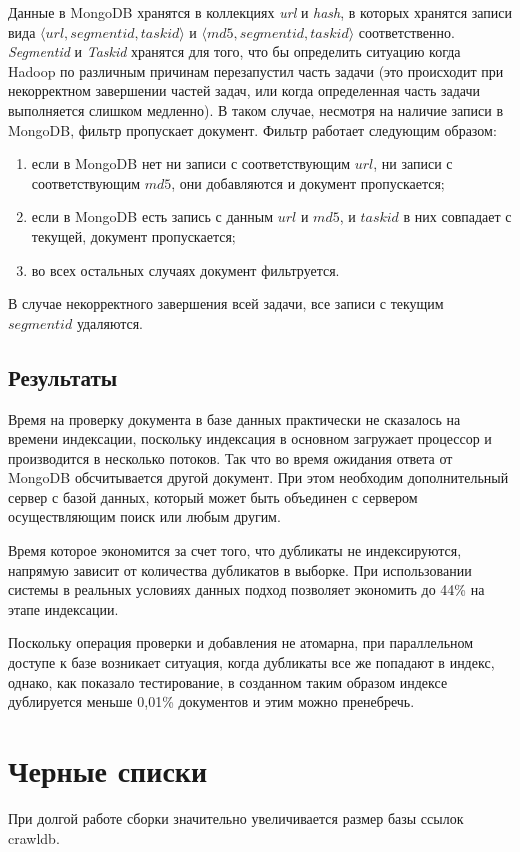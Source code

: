 Данные в MongoDB хранятся в коллекциях \textit{url} и \textit{hash}, в которых хранятся записи вида $\langle url,segmentid,taskid \rangle$ и $\langle md5,segmentid,taskid \rangle$ соответственно.
\textit{Segmentid} и \textit{Taskid} хранятся для того, что бы определить ситуацию когда Hadoop по различным причинам перезапустил часть задачи (это происходит при некорректном завершении частей задач, или когда определенная часть задачи выполняется слишком медленно). В таком случае, несмотря на наличие записи в MongoDB, фильтр пропускает документ. Фильтр работает следующим образом:
\begin{enumerate}
 \item если в MongoDB нет ни записи с соответствующим $url$, ни записи с соответствующим $md5$, они добавляются и документ пропускается;
 \item если в MongoDB есть запись с данным $url$ и $md5$, и $taskid$ в них совпадает с текущей, документ пропускается;
 \item во всех остальных случаях документ фильтруется.  
\end{enumerate}

В случае некорректного завершения всей задачи, все записи с текущим $segmentid$ удаляются.

\subsection{Результаты}
Время на проверку документа в базе данных практически не сказалось на времени индексации, поскольку индексация в основном загружает процессор и производится в несколько потоков. Так что во время ожидания ответа от MongoDB обсчитывается другой документ. При этом необходим дополнительный сервер с базой данных, который может быть объединен с сервером осуществляющим поиск или любым другим.

Время которое экономится за счет того, что дубликаты не индексируются, напрямую зависит от количества дубликатов в выборке. При использовании системы в реальных условиях данных подход позволяет экономить до 44\% на этапе индексации.

Поскольку операция проверки и добавления не атомарна, при параллельном доступе к базе возникает ситуация, когда дубликаты все же попадают в индекс, однако, как показало тестирование, в созданном таким образом индексе дублируется меньше 0,01\% документов и этим можно пренебречь.

\section{Черные списки}
При долгой работе сборки значительно увеличивается размер базы ссылок crawldb.


